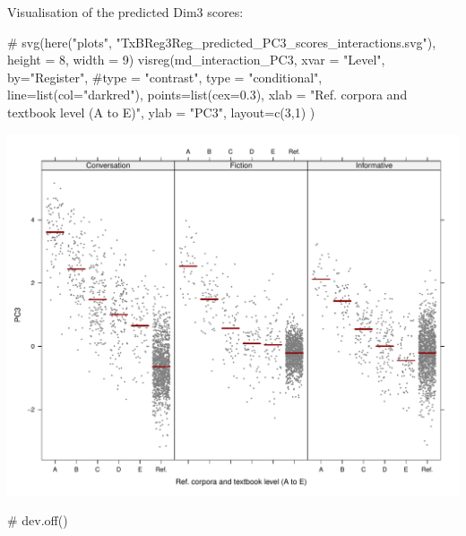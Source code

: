 \documentclass[
  letterpaper,
  DIV=11,
  numbers=noendperiod]{scrreprt}
\newenvironment{Shaded}{\begin{snugshade}}{\end{snugshade}}
\newcommand{\AttributeTok}[1]{\textcolor[rgb]{0.40,0.45,0.13}{#1}}
\newcommand{\CommentTok}[1]{\textcolor[rgb]{0.37,0.37,0.37}{#1}}
\newcommand{\DecValTok}[1]{\textcolor[rgb]{0.68,0.00,0.00}{#1}}
\newcommand{\FloatTok}[1]{\textcolor[rgb]{0.68,0.00,0.00}{#1}}
\newcommand{\FunctionTok}[1]{\textcolor[rgb]{0.28,0.35,0.67}{#1}}
\newcommand{\NormalTok}[1]{\textcolor[rgb]{0.00,0.23,0.31}{#1}}
\newcommand{\StringTok}[1]{\textcolor[rgb]{0.13,0.47,0.30}{#1}}
\begin{document}
Visualisation of the predicted Dim3 scores:

\begin{Shaded}
\begin{Highlighting}[]
\CommentTok{\# svg(here("plots", "TxBReg3Reg\_predicted\_PC3\_scores\_interactions.svg"), height = 8, width = 9)}
\FunctionTok{visreg}\NormalTok{(md\_interaction\_PC3, }\AttributeTok{xvar =} \StringTok{"Level"}\NormalTok{, }\AttributeTok{by=}\StringTok{"Register"}\NormalTok{, }
       \CommentTok{\#type = "contrast",}
       \AttributeTok{type =} \StringTok{"conditional"}\NormalTok{,}
       \AttributeTok{line=}\FunctionTok{list}\NormalTok{(}\AttributeTok{col=}\StringTok{"darkred"}\NormalTok{), }
       \AttributeTok{points=}\FunctionTok{list}\NormalTok{(}\AttributeTok{cex=}\FloatTok{0.3}\NormalTok{),}
       \AttributeTok{xlab =} \StringTok{"Ref. corpora and textbook level (A to E)"}\NormalTok{, }\AttributeTok{ylab =} \StringTok{"PC3"}\NormalTok{,}
       \AttributeTok{layout=}\FunctionTok{c}\NormalTok{(}\DecValTok{3}\NormalTok{,}\DecValTok{1}\NormalTok{)}
\NormalTok{)}
\end{Highlighting}
\end{Shaded}

\includegraphics{AppendixH_files/figure-pdf/Dim3estimateplots-1.pdf}

\begin{Shaded}
\begin{Highlighting}[]
\CommentTok{\# dev.off()}
\end{Highlighting}
\end{Shaded}
\end{document}
